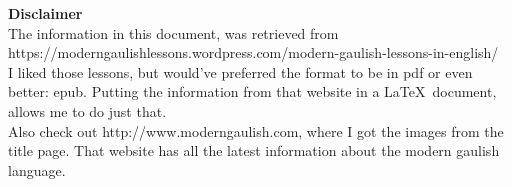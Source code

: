 \begin{center}
\textbf{Disclaimer}\\
\bigskip
\noindent The information in this document, was retrieved from https://moderngaulishlessons.wordpress.com/modern-gaulish-lessons-in-english/\\
\bigskip
\noindent I liked those lessons, but would've preferred the format to be in pdf or even better: epub. Putting the information from that website in a \LaTeX\ document, allows me to do just that.\\
\bigskip
\noindent Also check out http://www.moderngaulish.com, where I got the images from the title page. That website has all the latest information about the modern gaulish language.
\end{center}
